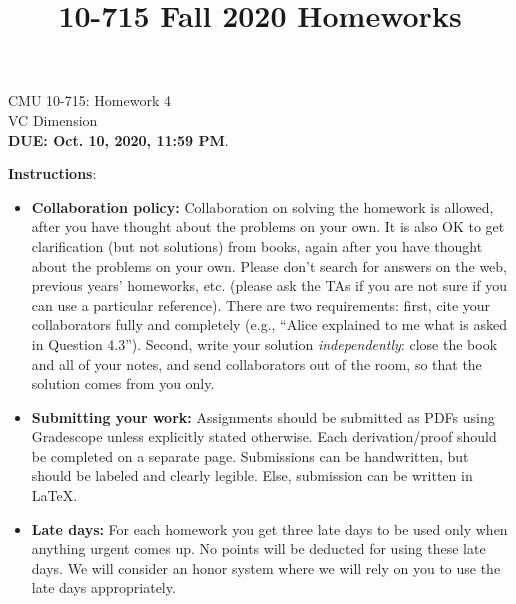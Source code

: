\documentclass{article}
\title{10-715 Fall 2020 Homeworks}
\begin{document}


\begin{center}
{\Large CMU 10-715: Homework 4}\\
VC Dimension \\
{\bf DUE: Oct. 10, 2020, 11:59 PM}.\\
\end{center}

\textbf{\large Instructions}:
\begin{itemize}
    \item \textbf{Collaboration policy:} Collaboration on solving the homework is allowed, after you have thought about the problems on your own. It is also OK to get clarification (but not solutions) from books, again after you have thought about the problems on your own. Please don’t search for answers on the web, previous years’ homeworks, etc. (please ask the TAs if you are not sure if you can use a particular reference). There are two requirements: first, cite your collaborators fully and completely (e.g., ``Alice explained to me what is asked in Question 4.3''). Second, write your solution \emph{independently}: close the book and all of your notes, and send collaborators out of the room, so that the solution comes from you only. 
    \item \textbf{Submitting your work:} Assignments should be submitted as PDFs using Gradescope unless explicitly stated otherwise. Each derivation/proof should be completed on a separate page. Submissions can be handwritten, but should be labeled and clearly legible. Else, submission can be written in LaTeX.
    
    \item \textbf{Late days:} For each homework you get three late days to be used only when anything urgent comes up. No points will be deducted for using these late days. We will consider an honor system where we will rely on you to use the late days appropriately.
    

\end{itemize}
\end{document}
